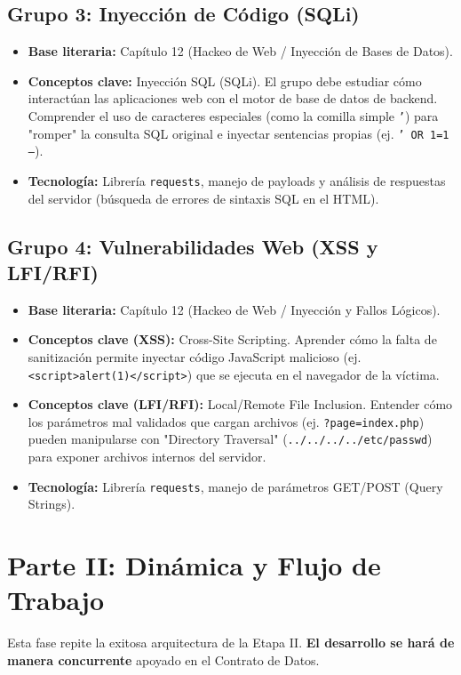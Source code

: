 \documentclass[12pt,letterpaper]{article}
\begin{document}
\subsection*{Grupo 3: Inyección de Código (SQLi)}
\begin{itemize}
    \item \textbf{Base literaria:} Capítulo 12 (Hackeo de Web / Inyección de Bases de Datos).
    \item \textbf{Conceptos clave:} Inyección SQL (SQLi). El grupo debe estudiar cómo interactúan las aplicaciones web con el motor de base de datos de backend. Comprender el uso de caracteres especiales (como la comilla simple \texttt{'}) para "romper" la consulta SQL original e inyectar sentencias propias (ej. \texttt{' OR 1=1 --}).
    \item \textbf{Tecnología:} Librería \texttt{requests}, manejo de payloads y análisis de respuestas del servidor (búsqueda de errores de sintaxis SQL en el HTML).
\end{itemize}

\subsection*{Grupo 4: Vulnerabilidades Web (XSS y LFI/RFI)}
\begin{itemize}
    \item \textbf{Base literaria:} Capítulo 12 (Hackeo de Web / Inyección y Fallos Lógicos).
    \item \textbf{Conceptos clave (XSS):} Cross-Site Scripting. Aprender cómo la falta de sanitización permite inyectar código JavaScript malicioso (ej. \texttt{<script>alert(1)</script>}) que se ejecuta en el navegador de la víctima.
    \item \textbf{Conceptos clave (LFI/RFI):} Local/Remote File Inclusion. Entender cómo los parámetros mal validados que cargan archivos (ej. \texttt{?page=index.php}) pueden manipularse con "Directory Traversal" (\texttt{../../../../etc/passwd}) para exponer archivos internos del servidor.
    \item \textbf{Tecnología:} Librería \texttt{requests}, manejo de parámetros GET/POST (Query Strings).
\end{itemize}

\newpage
\section{Parte II: Dinámica y Flujo de Trabajo}
Esta fase repite la exitosa arquitectura de la Etapa II. \textbf{El desarrollo se hará de manera concurrente} apoyado en el Contrato de Datos.
\end{document}
